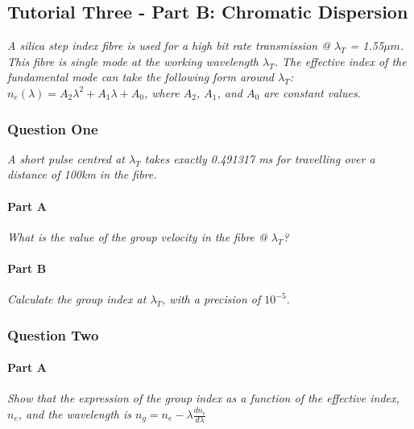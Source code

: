 \documentclass[colorlinks,11pt,a4paper,normalphoto,withhyper,ragged2e]{altareport}
\begin{document}
\subsection{Tutorial Three - Part B: Chromatic Dispersion}
\textit{A silica step index fibre is used for a high bit rate transmission @ $\lambda_T$ = 1.55$\mu m$. This fibre is single mode at the working wavelength $\lambda_T$. The effective index of the fundamental mode can take the following form around $\lambda_T$: $n_e(\lambda) = A_2 \lambda^2 + A_1 \lambda + A_0$, where $A_2$, $A_1$, and $A_0$ are constant values.} \linebreak




\subsubsection{Question One}
\textit{A short pulse centred at $\lambda_T$ takes exactly 0.491317 ms for travelling over a distance of 100km in the fibre.} \linebreak




\paragraph{Part A \linebreak}
\textit{What is the value of the group velocity in the fibre @ $\lambda_T$?} \linebreak




\paragraph{Part B \linebreak}
\textit{Calculate the group index at $\lambda_T$, with a precision of $10^{-5}$.} \linebreak




\subsubsection{Question Two}
\paragraph{Part A \linebreak}
\textit{Show that the expression of the group index as a function of the effective index, $n_e$, and the wavelength is $n_g = n_e - \lambda \frac{d n_e}{d \lambda}$} \linebreak
\end{document}
